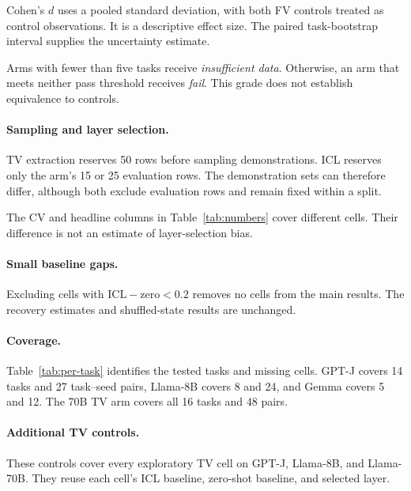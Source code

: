 \documentclass[11pt]{article}
\begin{document}
\begin{table}[t]
  \centering
  \small
  
  \caption{Exploratory method-minus-control recovery and task-bootstrap 95\% CIs.}
  \label{tab:paired-grid}
\end{table}

Cohen's $d$ uses a pooled standard deviation, with both FV controls treated as control observations. It is a descriptive effect size. The paired task-bootstrap interval supplies the uncertainty estimate.

Arms with fewer than five tasks receive \emph{insufficient data}. Otherwise, an arm that meets neither pass threshold receives \emph{fail}. This grade does not establish equivalence to controls.

\paragraph{Sampling and layer selection.} TV extraction reserves 50 rows before sampling demonstrations. ICL reserves only the arm's 15 or 25 evaluation rows. The demonstration sets can therefore differ, although both exclude evaluation rows and remain fixed within a split.

The CV and headline columns in Table~\ref{tab:numbers} cover different cells. Their difference is not an estimate of layer-selection bias.

\paragraph{Small baseline gaps.} Excluding cells with $\text{ICL}-\text{zero}<0.2$ removes no cells from the main results. The recovery estimates and shuffled-state results are unchanged.

\paragraph{Coverage.} Table~\ref{tab:per-task} identifies the tested tasks and missing cells. GPT-J covers 14 tasks and 27 task--seed pairs, Llama-8B covers 8 and 24, and Gemma covers 5 and 12. The 70B TV arm covers all 16 tasks and 48 pairs.

\paragraph{Additional TV controls.} These controls cover every exploratory TV cell on GPT-J, Llama-8B, and Llama-70B. They reuse each cell's ICL baseline, zero-shot baseline, and selected layer.
\end{document}
